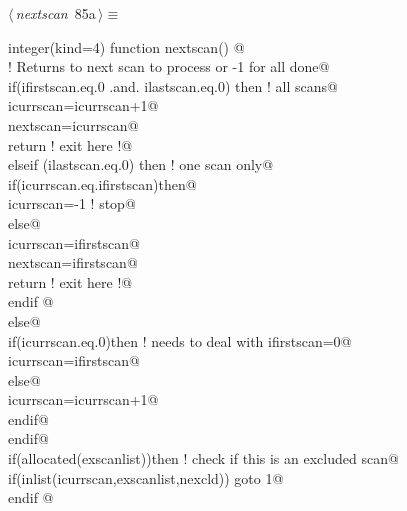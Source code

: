 \documentclass[10pt,a4paper,notitlepage]{article}
\begin{document}
\begin{flushleft} \small
\begin{minipage}{\linewidth}\label{scrap106}\raggedright\small
{} $\langle\,${\it nextscan}\nobreak\ {\footnotesize {85a}}$\,\rangle\equiv$
\vspace{-1ex}
\begin{list}{}{} \item
\mbox{}\verb@      integer(kind=4) function nextscan()      @\\
\mbox{}\verb@! Returns to next scan to process or -1 for all done@\\
\mbox{}     if(ifirstscan.eq.0 .and. ilastscan.eq.0) then          ! all scans@\\
\mbox{}\verb@         icurrscan=icurrscan+1@\\
\mbox{}\verb@         nextscan=icurrscan@\\
\mbox{}\verb@         return  ! exit here !@\\
\mbox{}\verb@      elseif (ilastscan.eq.0) then                       ! one scan only@\\
\mbox{}\verb@         if(icurrscan.eq.ifirstscan)then@\\
\mbox{}\verb@           icurrscan=-1 ! stop@\\
\mbox{}\verb@         else@\\
\mbox{}\verb@           icurrscan=ifirstscan@\\
\mbox{}\verb@           nextscan=ifirstscan@\\
\mbox{}\verb@           return ! exit here !@\\
\mbox{}\verb@         endif           @\\
\mbox{}\verb@      else@\\
\mbox{}\verb@        if(icurrscan.eq.0)then       ! needs to deal with ifirstscan=0@\\
\mbox{}\verb@           icurrscan=ifirstscan@\\
\mbox{}\verb@        else@\\
\mbox{}\verb@           icurrscan=icurrscan+1@\\
\mbox{}\verb@        endif@\\
\mbox{}\verb@      endif@\\
\mbox{}\verb@      if(allocated(exscanlist))then ! check if this is an excluded scan@\\
\mbox{}\verb@        if(inlist(icurrscan,exscanlist,nexcld)) goto 1@\\
\mbox{}\verb@      endif   @\\

\end{list}
\end{minipage}
\end{flushleft}
\end{document}
